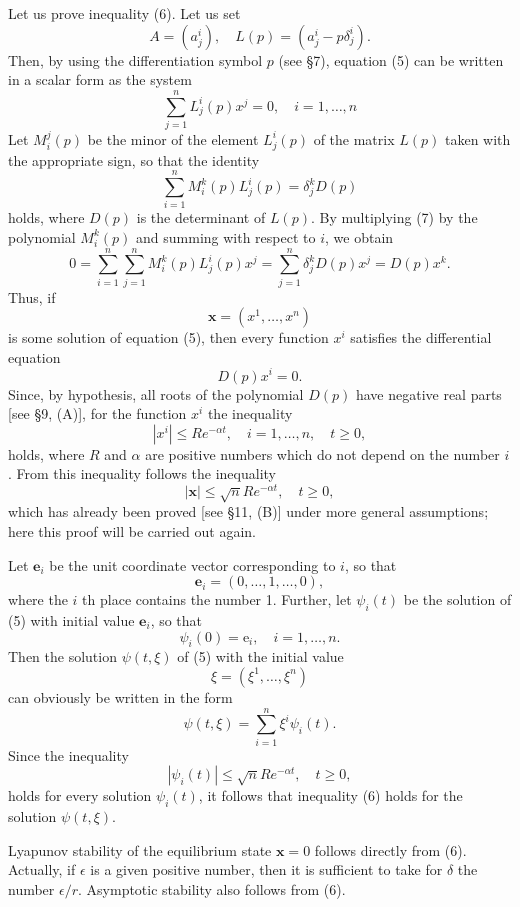 \documentclass[10pt,a5paper]{book}
\theoremstyle{plain}
\theoremstyle{definition}
\theoremstyle{remark}
\begin{document}
Let us prove inequality (6). Let us set
\[
A=\left(a_{j}^{i}\right), \quad L(p)=\left(a_{j}^{i}-p \delta_{j}^{i}\right) .
\]
Then, by using the differentiation symbol $p$ (see §7), equation (5) can be written in a scalar form as the system
\begin{equation*}
\sum_{j=1}^{n} L_{j}^{i}(p) x^{j}=0, \quad i=1, \ldots, n \tag{7}
\end{equation*}
Let $M_{i}^{j}(p)$ be the minor of the element $L_{j}^{i}(p)$ of the matrix $L(p)$ taken with the appropriate sign, so that the identity
\[
\sum_{i=1}^{n} M_{i}^{k}(p) L_{j}^{i}(p)=\delta_{j}^{k} D(p)
\]
holds, where $D(p)$ is the determinant of $L(p)$. By multiplying (7) by the polynomial $M_{i}^{k}(p)$ and summing with respect to $i$, we obtain
\[
0=\sum_{i=1}^{n} \sum_{j=1}^{n} M_{i}^{k}(p) L_{j}^{i}(p) x^{j}=\sum_{j=1}^{n} \delta_{j}^{k} D(p) x^{j}=D(p) x^{k} .
\]
Thus, if
\[
\mathbf{x}=\left(x^{1}, \ldots, x^{n}\right)
\]
is some solution of equation (5), then every function $x^{i}$ satisfies the differential equation
\[
D(p) x^{i}=0 .
\]
Since, by hypothesis, all roots of the polynomial $D(p)$ have negative real parts [see §9, (A)], for the function $x^{i}$ the inequality
\[
\left|x^{i}\right| \leq R e^{-\alpha t}, \quad i=1, \ldots, n, \quad t \geq 0,
\]
holds, where $R$ and $\alpha$ are positive numbers which do not depend on the number $i$. From this inequality follows the inequality
\[
|\mathbf{x}| \leq \sqrt{n} R e^{-\alpha t}, \quad t \geq 0,
\]
which has already been proved [see §11, (B)] under more general assumptions; here this proof will be carried out again.

Let $\mathbf{e}_{i}$ be the unit coordinate vector corresponding to $i$, so that
\[
\mathbf{e}_{i}=(0, \ldots, 1, \ldots, 0),
\]
where the $i$ th place contains the number 1. Further, let $\psi_{i}(t)$ be the
solution of (5) with initial value $\mathbf{e}_{i}$, so that
\[
\psi_{i}(0)=\mathrm{e}_{i}, \quad i=1, \ldots, n .
\]
Then the solution $\psi(t, \xi)$ of (5) with the initial value
\[
\xi=\left(\xi^{1}, \ldots, \xi^{n}\right)
\]
can obviously be written in the form
\begin{equation*}
\psi(t, \xi)=\sum_{i=1}^{n} \xi^{i} \psi_{i}(t) . \tag{8}
\end{equation*}
Since the inequality
\[
\left|\psi_{i}(t)\right| \leq \sqrt{n} R e^{-\alpha t}, \quad t \geq 0,
\]
holds for every solution $\psi_{i}(t)$, it follows that inequality (6) holds for the solution $\psi(t, \xi)$.

Lyapunov stability of the equilibrium state $\mathbf{x}=0$ follows directly from (6). Actually, if $\epsilon$ is a given positive number, then it is sufficient to take for $\delta$ the number $\epsilon / r$. Asymptotic stability also follows from (6).
\end{document}
